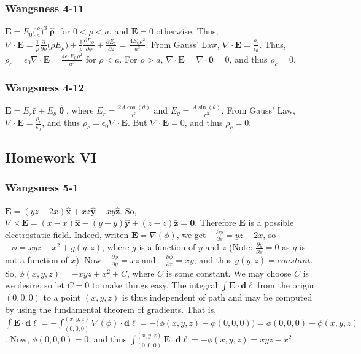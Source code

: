 \documentclass[oneside]{book}
\theoremstyle{mystyle}
\begin{document}
\subsubsection{Wangsness 4-11}
$\mathbf{E} = E_0 \big(\frac{\rho}{a}\big)^3 \hat{\boldsymbol{\uprho}}$ for $0 < \rho < a$, and $\mathbf{E} = 0$ otherwise. Thus, $\nabla \cdot \mathbf{E} = \frac{1}{\rho} \frac{\partial}{\partial \rho}\big(\rho E_{\rho}\big) + \frac{1}{\rho} \frac{\partial E_{\phi}}{\partial \phi} + \frac{\partial E_z}{\partial z}$ = $\frac{4E_0 \rho^2}{a^3}$. From Gauss' Law, $\nabla \cdot \mathbf{E} = \frac{\rho_c}{\epsilon_0}$. Thus, $\rho_c = \epsilon_0 \nabla \cdot \mathbf{E} = \frac{4\epsilon_0 E_0 \rho^2}{a^3}$ for $\rho<a$. For $\rho>a$, $\nabla \cdot \mathbf{E} = \nabla \cdot \mathbf{0} = 0$, and thus $\rho_c = 0$.
\subsubsection{Wangsness 4-12}
$\mathbf{E} = E_r \hat{\mathbf{r}}+E_{\theta} \hat{\boldsymbol{\uptheta}}$, where $E_r = \frac{2A\cos(\theta)}{r^3}$ and $E_{\theta} = \frac{A\sin(\theta)}{r^3}$. From Gauss' Law, $\nabla \cdot \mathbf{E} = \frac{\rho_c}{\epsilon_0}$, and thus $\rho_c = \epsilon_0 \nabla \cdot \mathbf{E}$. But $\nabla \cdot \mathbf{E} = 0$, and thus $\rho_c = 0$.
\subsection{Homework VI}
\subsubsection{Wangsness 5-1}
$\mathbf{E} = (yz-2x)\hat{\mathbf{x}}+xz\hat{\mathbf{y}}+xy\hat{\mathbf{z}}$. So, $\nabla \times \mathbf{E} = (x-x)\hat{\mathbf{x}}-(y-y)\hat{\mathbf{y}}+(z-z)\hat{\mathbf{z}} = \mathbf{0}$. Therefore $\mathbf{E}$ is a possible electrostatic field. Indeed, writen $\mathbf{E} = \nabla(\phi)$, we get $-\frac{\partial \phi}{\partial x} = yz-2x$, so $-\phi = xyz - x^2 + g(y,z)$, where $g$ is a function of $y$ and $z$ (Note: $\frac{\partial g}{\partial x} = 0$ as $g$ is not a function of $x$). Now $-\frac{\partial \phi}{\partial y} = xz$ and $-\frac{\partial \phi}{\partial z} = xy$, and thus $g(y,z) = constant$. So, $\phi(x,y,z) = -xyz+x^2 + C$, where $C$ is some constant. We may choose $C$ is we desire, so let $C=0$ to make things easy. The integral $\int \mathbf{E}\cdot \mathbf{d\ell}$ from the origin $(0,0,0)$ to a point $(x,y,z)$ is thus independent of path and may be computed by using the fundamental theorem of gradients. That is, $\int \mathbf{E}\cdot \mathbf{d\ell} = -\int _{(0,0,0)}^{(x,y,z)} \nabla(\phi)\cdot \mathbf{d\ell} = -\big(\phi(x,y,z) -\phi(0,0,0)\big) = \phi(0,0,0)-\phi(x,y,z)$. Now, $\phi(0,0,0)= 0$, and thus $\int_{(0,0,0)}^{(x,y,z)}\mathbf{E}\cdot \mathbf{d\ell} = -\phi(x,y,z) = xyz-x^2$.
\end{document}
